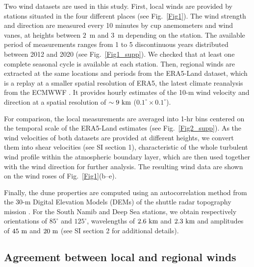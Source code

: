   Two wind datasets are used in this study. First, local winds are provided by stations situated in the four different places (see Fig.~\ref{Fig1}). The wind strength and direction are measured every 10 minutes by cup anemometers and wind vanes, at heights between $2$~m and $3$~m depending on the station. The available period of measurements ranges from 1 to 5 discontinuous years distributed between 2012 and 2020 (see Fig.~\ref{Fig1_supp}). We checked that at least one complete seasonal cycle is available at each station.
  Then, regional winds are extracted at the same locations and periods from the ERA5-Land dataset, which is a replay at a smaller spatial resolution of ERA5, the latest climate reanalysis from the ECMWWF \citep{Hersbach2020, munoz2021}. It provides hourly estimates of the 10-m wind velocity and direction at a spatial resolution of $\sim 9~\textup{km}$ ($0.1^\circ\times0.1^\circ$).

  For comparison, the local measurements are averaged into 1-hr bins centered on the temporal scale of the ERA5-Land estimates (see Fig.~\ref{Fig2_supp}). As the wind velocities of both datasets are provided at different heights, we convert them into shear velocities (see SI section 1), characteristic of the whole turbulent wind profile within the atmospheric boundary layer, which are then used together with the wind direction for further analysis. The resulting wind data are shown on the wind roses of Fig.~\ref{Fig1}(b--e).

  Finally, the dune properties are computed using an autocorrelation method from the 30-m Digital Elevation Models (DEMs) of the shuttle radar topography mission \citep{Farr2007}. For the South Namib and Deep Sea stations, we obtain respectively orientations of $85^\circ$ and $125^\circ$, wavelengths of $2.6~\textup{km}$ and $2.3~\textup{km}$ and amplitudes of $45~\textup{m}$ and $20~\textup{m}$ (see SI section 2 for additional details).

  \subsection{Agreement between local and regional winds}

